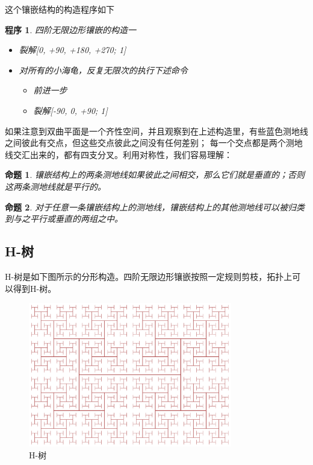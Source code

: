 \documentclass[a4paper,12pt]{article}
\newtheorem{proposition}{命题}
\newtheorem{program}{程序}
\begin{document}
这个镶嵌结构的构造程序如下

\begin{program}
四阶无限边形镶嵌的构造一
\begin{itemize}
\item 裂解[0, +90, +180, +270; 1]
\item 对所有的小海龟，反复无限次的执行下述命令
\begin{itemize}\item 前进一步 \item 裂解[-90, 0, +90; 1] \end{itemize}
\end{itemize}
\end{program}

如果注意到双曲平面是一个齐性空间，并且观察到在上述构造里，有些蓝色测地线之间彼此有交点，但这些交点彼此之间没有任何差别；
每一个交点都是两个测地线交汇出来的，都有四支分叉。利用对称性，我们容易理解：

\begin{proposition}
\label{A}
镶嵌结构上的两条测地线如果彼此之间相交，那么它们就是垂直的；否则这两条测地线就是平行的。
\end{proposition}

\begin{proposition}
\label{B}
对于任意一条镶嵌结构上的测地线，镶嵌结构上的其他测地线可以被归类到与之平行或垂直的两组之中。
\end{proposition}

\subsection{H-树}

H-树是如下图所示的分形构造。四阶无限边形镶嵌按照一定规则剪枝，拓扑上可以得到H-树。

\begin{figure}[ht]
\centering
\includegraphics[width=3.5in]{images/2000px-H_tree.png}
\caption{H-树}
\end{figure}
\end{document}
